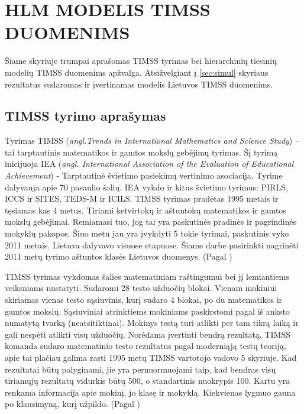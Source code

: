 \documentclass[11pt,a4paper]{article}
\begin{document}
\newpage
\section{HLM MODELIS TIMSS DUOMENIMS} \label{sec:timss}
\indent Šiame skyriuje trumpai aprašomas TIMSS tyrimas bei hierarchinių tiesinių modelių TIMSS duomenims apžvalga. Atsižvelgiant į \ref{sec:simul} skyriaus rezultatus sudaromas ir įvertinamas modelis Lietuvos TIMSS duomenims.

\subsection{TIMSS tyrimo aprašymas} \label{subsec:timss1}

\indent Tyrimas TIMSS (\textit{angl.Trends in International Mathematics and Science Study}) – tai tarptautinis matematikos ir gamtos mokslų gebėjimų tyrimas. Šį tyrimą inicijuoja IEA (\textit{angl. International Association of the Evaluation of Educational Achievement}) - Tarptautinė švietimo pasiekimų vertinimo asociacija. Tyrime dalyvauja apie 70 pasaulio šalių. IEA vykdo ir kitus švietimo tyrimus: PIRLS, ICCS ir SITES, TEDS-M ir ICILS. TIMSS tyrimas pradėtas 1995 metais ir tęsiamas kas 4 metus. Tiriami ketvirtokų ir aštuntokų matematikos ir gamtos mokslų gebėjimai. Remiamasi tuo, jog tai yra paskutinės pradinės ir pagrindinės mokyklų pakopos. Šiuo metu jau yra įvykdyti 5 tokie tyrimai, paskutinis vyko 2011 metais. Lietuva dalyvavo visuose etapuose. Šiame darbe pasirinkti nagrinėti 2011 metų tyrimo aštuntos klasės Lietuvos duomenys. (Pagal \cite{timss2011lt})

\indent TIMSS tyrimas vykdomas šalies matematiniam raštingumui bei jį lemiantiems veiksniams nustatyti. Sudaromi 28 testo užduočių blokai. Vienam mokiniui skiriamas vienas testo sąsiuvinis, kurį sudaro 4 blokai, po du matematikos ir gamtos mokslų. Sąsiuviniai atrinktiems mokiniams paskirstomi pagal iš anksto numatytą tvarką (neatsitiktinai). Mokinys testą turi atlikti per tam tikrą laiką ir gali nespėti atlikti visų užduočių. Norėdama įvertinti bendrą rezultatą, TIMSS komanda sudaro matematinio testo rezultatus pagal moderniąją testų teoriją, apie tai plačiau galima rasti 1995 metų TIMSS vartotojo vadovo \cite{timss1995} 5 skyriuje. Kad rezultatai būtų palyginami, jie yra pernuormuojami taip, kad bendras visų tiriamųjų rezultatų vidurkis būtų 500, o standartinis nuokrypis 100. Kartu yra renkama informacija apie mokinį, jo klasę ir mokyklą. Kiekvienas lygmuo gauna po klausimyną, kurį užpildo. (Pagal \cite{timss2011lt})
\end{document}

